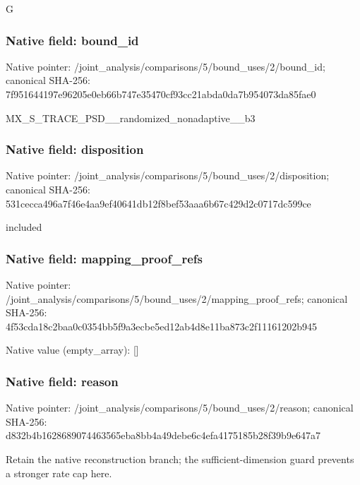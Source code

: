 \documentclass[10pt,a4paper]{article}
\begin{document}
\begingroup\raggedright\sloppy G\par\endgroup

\subsubsection{Native field: bound\_\allowbreak{}id}
Native pointer: /joint\_\allowbreak{}analysis/comparisons/5/bound\_\allowbreak{}uses/2/bound\_\allowbreak{}id; canonical SHA-256: 7f951644197e96205e0eb66b747e35470cf93cc21abda0da7b954073da85fae0

\begingroup\raggedright\sloppy MX\_\allowbreak{}S\_\allowbreak{}TRACE\_\allowbreak{}PSD\_\allowbreak{}\_\allowbreak{}randomized\_\allowbreak{}nonadaptive\_\allowbreak{}\_\allowbreak{}b3\par\endgroup

\subsubsection{Native field: disposition}
Native pointer: /joint\_\allowbreak{}analysis/comparisons/5/bound\_\allowbreak{}uses/2/disposition; canonical SHA-256: 531cecca496a7f46e4aa9ef40641db12f8bef53aaa6b67c429d2c0717dc599ce

\begingroup\raggedright\sloppy included\par\endgroup

\subsubsection{Native field: mapping\_\allowbreak{}proof\_\allowbreak{}refs}
Native pointer: /joint\_\allowbreak{}analysis/comparisons/5/bound\_\allowbreak{}uses/2/mapping\_\allowbreak{}proof\_\allowbreak{}refs; canonical SHA-256: 4f53cda18c2baa0c0354bb5f9a3ecbe5ed12ab4d8e11ba873c2f11161202b945

Native value (empty\_\allowbreak{}array): []

\subsubsection{Native field: reason}
Native pointer: /joint\_\allowbreak{}analysis/comparisons/5/bound\_\allowbreak{}uses/2/reason; canonical SHA-256: d832b4b1628689074463565eba8bb4a49debe6c4efa4175185b28f39b9e647a7

\begingroup\raggedright\sloppy Retain the native reconstruction branch;\allowbreak{} the sufficient-dimension guard prevents a stronger rate cap here.\par\endgroup
\end{document}
